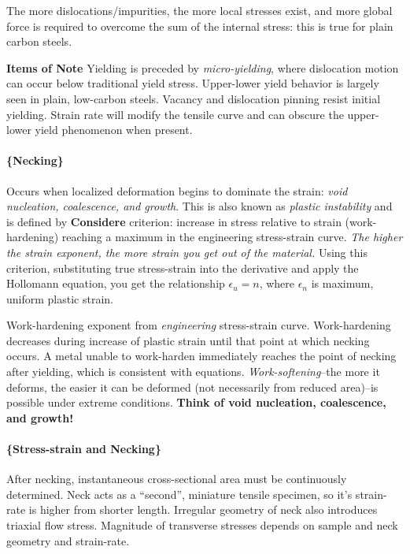 \documentclass[
]{article}
\begin{document}
The more dislocations/impurities, the more local stresses exist, and
more global force is required to overcome the sum of the internal
stress: this is true for plain carbon steels.

\textbf{Items of Note} Yielding is preceded by \textit{micro-yielding},
where dislocation motion can occur below traditional yield stress.
Upper-lower yield behavior is largely seen in plain, low-carbon steels.
Vacancy and dislocation pinning resist initial yielding. Strain rate
will modify the tensile curve and can obscure the upper-lower yield
phenomenon when present.

\hypertarget{necking}{%
\paragraph{\{Necking\}}\label{necking}}

Occurs when localized deformation begins to dominate the strain:
\textit{void nucleation, coalescence, and growth}. This is also known as
\textit{plastic instability} and is defined by \textbf{Considere}
criterion: increase in stress relative to strain (work-hardening)
reaching a maximum in the engineering stress-strain curve.
\textit{The higher the strain exponent, the more strain you get out of the material.}
Using this criterion, substituting true stress-strain into the
derivative and apply the Hollomann equation, you get the relationship
\(\epsilon_{u} = n\), where \(\epsilon_{n}\) is maximum, uniform plastic
strain.

Work-hardening exponent from \textit{engineering} stress-strain curve.
Work-hardening decreases during increase of plastic strain until that
point at which necking occurs. A metal unable to work-harden immediately
reaches the point of necking after yielding, which is consistent with
equations. \textit{Work-softening}--the more it deforms, the easier it
can be deformed (not necessarily from reduced area)--is possible under
extreme conditions.
\textbf{Think of void nucleation, coalescence, and growth!}

\hypertarget{stress-strain-and-necking}{%
\paragraph{\{Stress-strain and
Necking\}}\label{stress-strain-and-necking}}

After necking, instantaneous cross-sectional area must be continuously
determined. Neck acts as a ``second'', miniature tensile specimen, so
it's strain-rate is higher from shorter length. Irregular geometry of
neck also introduces triaxial flow stress. Magnitude of transverse
stresses depends on sample and neck geometry and strain-rate.
\end{document}
